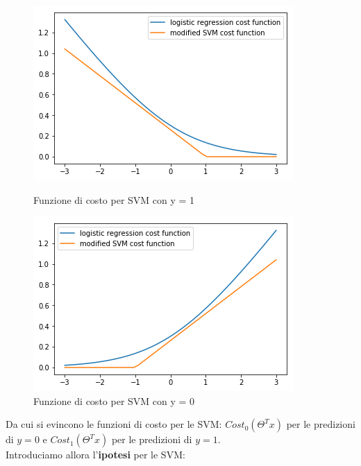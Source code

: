 \begin{figure}[!htb]
   \begin{minipage}{0.48\textwidth}
     \centering
     \includegraphics[width=1\linewidth]{img/costFunSVMy1.png}
     \caption{Funzione di costo per SVM con y = 1}\label{fig:SVMCosty1}
   \end{minipage}\hfill
   \begin{minipage}{0.48\textwidth}
     \centering
     \includegraphics[width=1\linewidth]{img/costFunSVMy0.png}
     \caption{Funzione di costo per SVM con y = 0}\label{fig:SVMCosty0}
   \end{minipage}
\end{figure}
Da cui si evincono le funzioni di costo per le SVM: $Cost_0(\Theta^Tx)$ per le predizioni di $y=0$ e $Cost_1(\Theta^Tx)$ per le predizioni di $y=1$.\\ 
Introduciamo allora l'\textbf{ipotesi} per le SVM:
